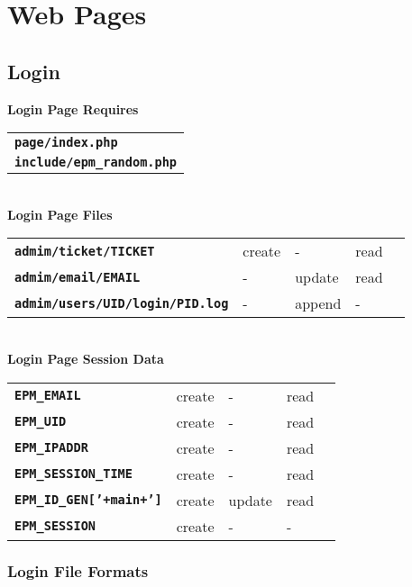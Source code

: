 \documentclass[12pt]{article}
\newcommand{\TT}[1]{{\tt \bfseries #1}}
\begin{document}
\section{Web Pages}

\subsection{Login}

\begin{center}
{\bf Login Page Requires}
\\[1ex]
\begin{tabular}{l}
\TT{page/index.php} \\
\TT{include/epm\_random.php} \\
\end{tabular}
\\[3ex]
{\bf Login Page Files}
\\[1ex]
\begin{tabular}{lllll}
\TT{admim/ticket/TICKET}	& create  & -      & read \\
\TT{admim/email/EMAIL}	& -       & update & read \\
\TT{admim/users/UID/login/PID.log}
			& -       & append & - \\
\end{tabular}
\\[3ex]
{\bf Login Page Session Data}
\\[1ex]
\begin{tabular}{lllll}
\TT{EPM\_EMAIL}	& create  & -      & read \\
\TT{EPM\_UID}	& create  & -      & read    \\
\TT{EPM\_IPADDR}& create  & -      & read \\
\TT{EPM\_SESSION\_TIME}
                & create  & -      & read \\
\TT{EPM\_ID\_GEN['+main+']}
                & create  & update & read \\
\TT{EPM\_SESSION}
                & create  & -      & - \\
\end{tabular}
\end{center}

\subsubsection{Login File Formats}
\end{document}
